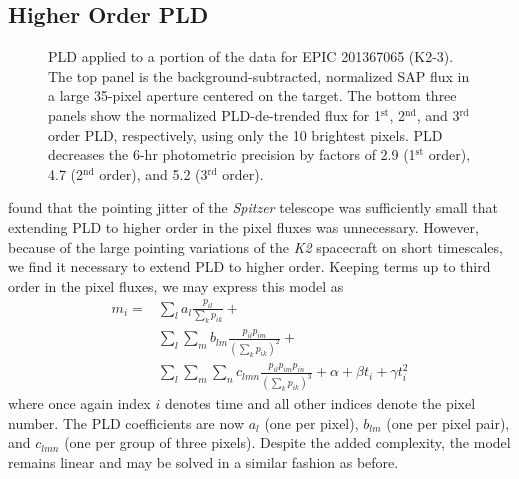 \documentclass[]{emulateapj}
\begin{document}
\subsection{Higher Order PLD}
\label{sec:higherorder}
\begin{figure}[h]
  \begin{center}
       \caption{PLD applied to a portion of the data for EPIC 201367065 (K2-3). 
       The top panel is the background-subtracted, normalized SAP flux in a large 
       35-pixel aperture centered on the target. The bottom three panels show 
       the normalized PLD-de-trended flux for 1$^{\mathrm{st}}$, 2$^{\mathrm{nd}}$, and 
       3$^{\mathrm{rd}}$ order PLD, respectively, using only the 10 brightest pixels. 
       PLD decreases the 6-hr photometric precision by factors of 2.9 (1$^{\mathrm{st}}$ order), 4.7 
       (2$^{\mathrm{nd}}$ order), and 5.2 (3$^{\mathrm{rd}}$ order).\\[0.25in]}
     \label{fig:third_order}
  \end{center}
\end{figure}

\cite{DEM15} found that the pointing jitter of the \emph{Spitzer} telescope was 
sufficiently small that extending PLD to higher order in the pixel fluxes was
unnecessary. However, because of the large pointing variations of the \emph{K2}
spacecraft on short timescales, we find it necessary to extend PLD to higher order.
Keeping terms up to third order in the pixel fluxes, we may express this model as 
\begin{align}
\label{eq:pldmodel}
m_i = &\sum\limits_{l}a_l\frac{p_{il}}{\sum\limits_{k}p_{ik}} + \nonumber\\
      &\sum\limits_{l}\sum\limits_{m}b_{lm}\frac{p_{il}p_{im}}{(\sum\limits_{k}p_{ik})^2} + \nonumber\\
      &\sum\limits_{l}\sum\limits_{m}\sum\limits_{n}c_{lmn}\frac{p_{il}p_{im}p_{in}}{(\sum\limits_{k}p_{ik})^3} + \alpha + \beta t_i + \gamma t_i^2
\end{align}
where once again index $i$ denotes time and all other indices denote the pixel number. 
The PLD coefficients are now $a_l$ (one per pixel), 
$b_{lm}$ (one per pixel pair), and $c_{lmn}$ (one per group of three pixels). Despite
the added complexity, the model remains linear and may be solved in a similar fashion 
as before.
\end{document}
